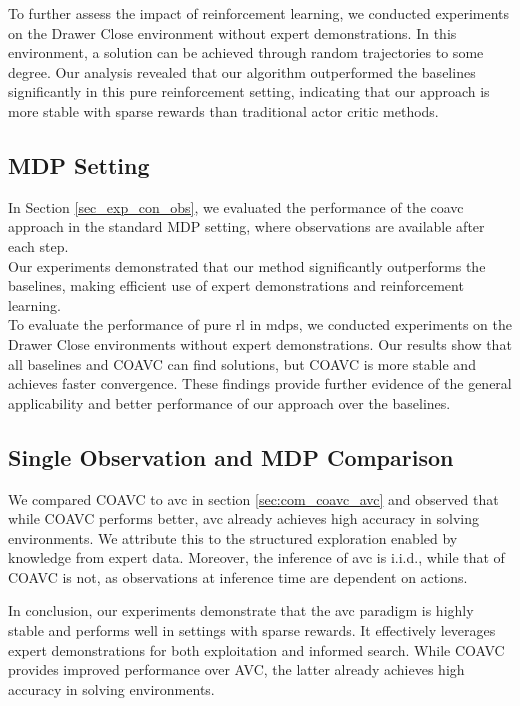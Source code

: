 To further assess the impact of reinforcement learning, we conducted experiments on the Drawer Close environment without expert demonstrations. 
In this environment, a solution can be achieved through random trajectories to some degree. 
Our analysis revealed that our algorithm outperformed the baselines significantly in this pure reinforcement setting, 
indicating that our approach is more stable with sparse rewards than traditional actor critic methods.\\




\subsection{MDP Setting}
In Section \ref{sec_exp_con_obs}, we evaluated the performance of the \ac{coavc} approach in the standard MDP setting, 
where observations are available after each step.\\

Our experiments demonstrated that our method significantly outperforms the baselines, making efficient use of expert demonstrations and reinforcement learning.\\

To evaluate the performance of pure \ac{rl} in \ac{mdp}s, we conducted experiments on the Drawer Close 
environments without expert demonstrations. Our results show that all baselines and COAVC can find solutions, but COAVC is more stable and achieves 
faster convergence. These findings provide further evidence of the general applicability and better performance of our approach over the baselines. 

\subsection{Single Observation and MDP Comparison}
We compared COAVC to \ac{avc} in section \ref{sec:com_coavc_avc} and observed that while COAVC performs better, 
\ac{avc} already achieves high accuracy in solving environments. We attribute this to the structured exploration enabled by knowledge from 
expert data. Moreover, the inference of \ac{avc} is i.i.d., while that of COAVC is not, as observations at inference time are dependent on actions. 

In conclusion, our experiments demonstrate that the \ac{avc} paradigm is highly stable and performs well in settings with sparse rewards. 
It effectively leverages expert demonstrations for both exploitation and informed search. While COAVC provides improved performance over 
AVC, the latter already achieves high accuracy in solving environments.

